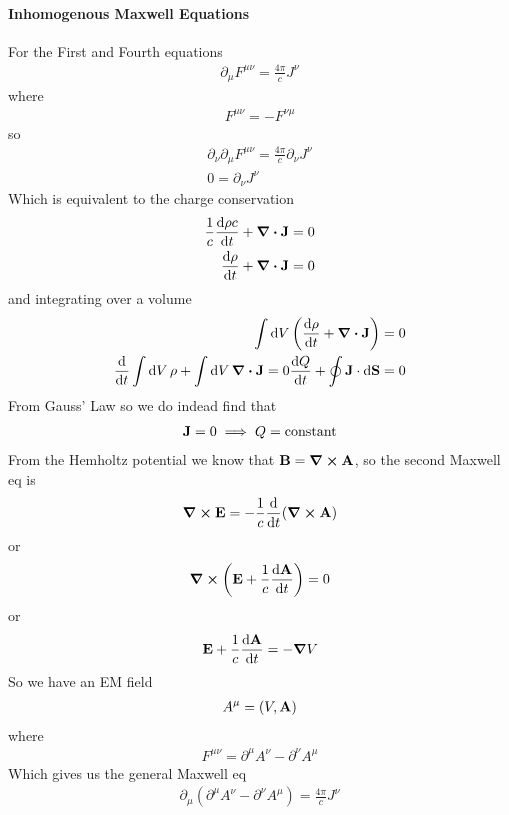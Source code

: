 \documentclass[../main.tex]{subfiles}
\begin{document}
\paragraph*{Inhomogenous Maxwell Equations}
For the First and Fourth equations
\begin{align*}
    \partial_\mu F^{\mu \nu} = \frac{4\pi}{c} J^\nu
\end{align*}
where
\begin{align*}
    F^{\mu\nu} = - F^{\nu\mu}
\end{align*}
so
\begin{align*}
    \partial_\nu \partial_\mu F^{\mu\nu} = \frac{4\pi}{c} \partial_\nu J^\nu \\
    0 = \partial_\nu J^\nu
\end{align*}
Which is equivalent to the charge conservation
\begin{align*}
    \frac{1}{c}  \dv{\rho c}{t} + \div \vb J = 0 \\
    \dv{\rho}{t} + \div \vb J = 0 
\end{align*}
and integrating over a volume
\begin{align*}
    \int \dd{V} \qt(\dv{\rho}{t} + \div \vb J) = 0 \\
    \dv{t} \int \dd{V} \rho + \int \dd{V} \div \vb J = 0 
    \dv{Q}{t} + \oint \vb J \cdot \dd{\vb S} = 0
\end{align*}
From Gauss' Law so we do indead find that 
\begin{align*}
    \vb J = 0 \implies Q = \text{constant}
\end{align*}
From the Hemholtz potential we know that $\vb B = \curl \vb A$, so the second Maxwell eq is
\begin{align*}
    \curl \vb E =  - \frac{1}{c} \dv{t}(\curl \vb A)
\end{align*}
or
\begin{align*}
    \curl(\vb E + \frac{1}{c} \dv{\vb A}{t}) = 0
\end{align*}
or
\begin{align*}
    \vb E + \frac{1}{c} \dv{\vb A}{t} = - \grad V
\end{align*}
So we have an EM field
\begin{align*}
    A^\mu = (V, \vb A)
\end{align*}
where
\begin{align*}
    F^{\mu\nu} = \partial^\mu A^\nu - \partial^\nu A^\mu
\end{align*}
Which gives us the general Maxwell eq
\begin{align*}
    \partial_\mu (\partial^\mu A^\nu - \partial^\nu A^\mu) = \frac{4\pi}{c} J^\nu
\end{align*}
\end{document}

